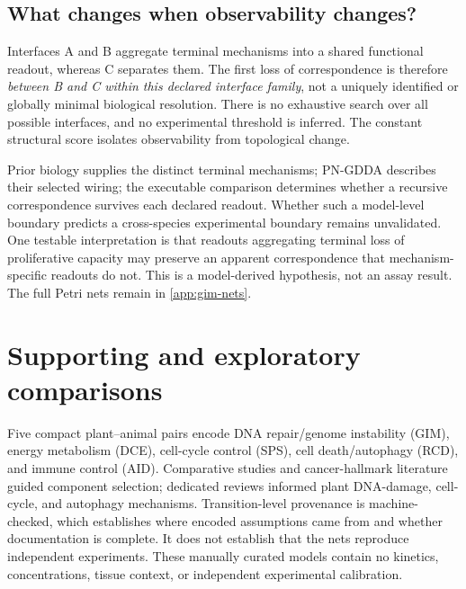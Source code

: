 \documentclass{ws-jbcb}
\numberwithin{equation}{section}
\begin{document}
\begin{table}[t]
\end{table}

\subsection{What changes when observability changes?}
Interfaces A and B aggregate terminal mechanisms into a shared functional
readout, whereas C separates them. The first loss of correspondence is therefore
\emph{between B and C within this declared interface family}, not a uniquely
identified or globally minimal biological resolution. There is no exhaustive
search over all possible interfaces, and no experimental threshold is inferred.
The constant structural score isolates observability from topological change.

Prior biology supplies the distinct terminal mechanisms; PN-GDDA describes
their selected wiring; the executable comparison determines whether a
recursive correspondence survives each declared readout. Whether such a
model-level boundary predicts a cross-species experimental boundary remains
unvalidated. One testable interpretation is that readouts aggregating terminal
loss of proliferative capacity may preserve an apparent correspondence that
mechanism-specific readouts do not. This is a model-derived hypothesis, not an
assay result. The full Petri nets remain in \ref{app:gim-nets}.

\section{Supporting and exploratory comparisons}\label{sec:case-method}

Five compact plant--animal pairs encode DNA repair/genome instability (GIM), energy
metabolism (DCE), cell-cycle control (SPS), cell death/autophagy (RCD), and
immune control (AID). Comparative studies and cancer-hallmark literature guided
component selection; dedicated reviews informed plant DNA-damage, cell-cycle,
and autophagy mechanisms.\cite{Quimbaya2012,ClavijoBuritica2023,Hanahan2022,
Yoshiyama2013} Transition-level provenance is machine-checked, which establishes
where encoded assumptions came from and whether documentation is complete. It
does not establish that the nets reproduce independent experiments. These
manually curated models contain no kinetics, concentrations, tissue context, or
independent experimental calibration.
\end{document}
